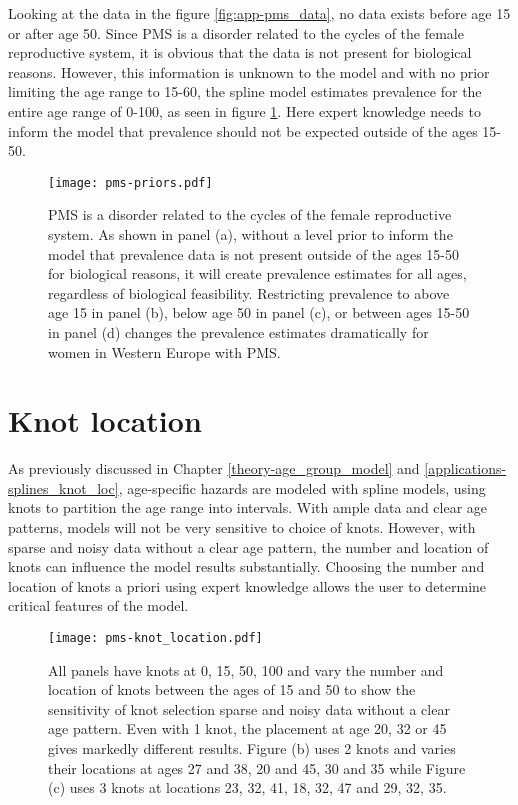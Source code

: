 Looking at the data in the figure \ref{fig:app-pms_data}, no data exists before age 15 or after age 50.  Since PMS is a disorder related to the cycles of the female reproductive system, it is obvious that the data is not present for biological reasons.  However, this information is unknown to the model and with no prior limiting the age range to 15-60, the spline model estimates prevalence for the entire age range of 0-100, as seen in figure \ref{fig:app-prios_on_level}.  Here expert knowledge needs to inform the model that prevalence should not be expected outside of the ages 15-50.

    \begin{figure}
        \begin{center}
            \texttt{[image: pms-priors.pdf]}
        \end{center}
        \caption{PMS is a disorder related to the cycles of the female reproductive system.  As shown in panel (a), without a level prior to inform the model that prevalence data is not present outside of the ages 15-50 for biological reasons, it will create prevalence estimates for all ages, regardless of biological feasibility.  Restricting prevalence to above age 15 in panel (b), below age 50 in panel (c), or between ages 15-50 in panel (d) changes the prevalence estimates dramatically for women in Western Europe with PMS.}
        \label{fig:app-prios_on_level}
    \end{figure}

\section{Knot location}
As previously discussed in Chapter \ref{theory-age_group_model} and \ref{applications-splines_knot_loc}, age-specific hazards are modeled with spline models, using knots to partition the age range into intervals.  With ample data and clear age patterns, models will not be very sensitive to choice of knots.  However, with sparse and noisy data without a clear age pattern, the number and location of knots can influence the model results substantially.  Choosing the number and location of knots a priori using expert knowledge allows the user to determine critical features of the model.

    \begin{figure}
        \begin{center}
            \texttt{[image: pms-knot\_location.pdf]}
        \end{center}
        \caption{All panels have knots at 0, 15, 50, 100 and vary the number and location of knots between the ages of 15 and 50 to show the sensitivity of knot selection sparse and noisy data without a clear age pattern. Even with 1 knot, the placement at age 20, 32 or 45 gives markedly different results.  Figure (b) uses 2 knots and varies their locations at ages 27 and 38, 20 and 45, 30 and 35 while Figure (c) uses 3 knots at locations {23, 32, 41}, {18, 32, 47} and {29, 32, 35}.}
        \label{fig:app-knot_loc}
    \end{figure}


